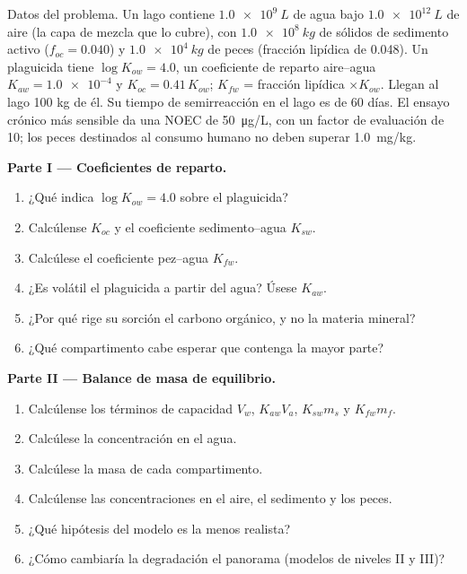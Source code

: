 \begin{problem}
\label{pb:b3:environmental-toxicology:1}
Datos del problema. Un lago contiene $\qty{1.0e9}{L}$ de agua bajo $\qty{1.0e12}{L}$ de aire (la capa de mezcla que lo cubre),
con $\qty{1.0e8}{kg}$ de sólidos de sedimento activo ($f_{oc} = 0.040$) y $\qty{1.0e4}{kg}$ de peces (fracción lipídica de 0.048).
Un plaguicida tiene $\log K_{ow} = 4.0$, un coeficiente de reparto aire--agua $K_{aw} = \num{1.0e-4}$ y $K_{oc} = 0.41\,K_{ow}$;
$K_{fw}$ = fracción lipídica $\times K_{ow}$. Llegan al lago 100 kg de él. Su tiempo de semirreacción en el lago es de 60 días.
El ensayo crónico más sensible da una NOEC de \qty{50}{\micro g/L}, con un factor de evaluación de 10;
los peces destinados al consumo humano no deben superar \qty{1.0}{mg/kg}.

\medskip\noindent\textbf{Parte I --- Coeficientes de reparto.}
\begin{enumerate}
  \item ¿Qué indica $\log K_{ow} = 4.0$ sobre el plaguicida?
  \item Calcúlense $K_{oc}$ y el coeficiente sedimento--agua $K_{sw}$.
  \item Calcúlese el coeficiente pez--agua $K_{fw}$.
  \item ¿Es volátil el plaguicida a partir del agua? Úsese $K_{aw}$.
  \item ¿Por qué rige su sorción el carbono orgánico, y no la materia mineral?
  \item ¿Qué compartimento cabe esperar que contenga la mayor parte?
\end{enumerate}

\medskip\noindent\textbf{Parte II --- Balance de masa de equilibrio.}
\begin{enumerate}[resume]
  \item Calcúlense los términos de capacidad $V_w$, $K_{aw}V_a$, $K_{sw}m_s$ y $K_{fw}m_f$.
  \item Calcúlese la concentración en el agua.
  \item Calcúlese la masa de cada compartimento.
  \item Calcúlense las concentraciones en el aire, el sedimento y los peces.
  \item ¿Qué hipótesis del modelo es la menos realista?
  \item ¿Cómo cambiaría la degradación el panorama (modelos de niveles II y III)?
\end{enumerate}


\end{problem}
